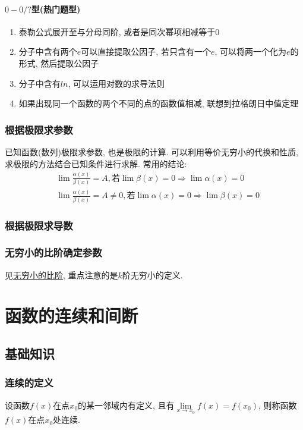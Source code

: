 \subsubsection{$ 0-0/? $型(热门题型)}
\begin{enumerate}
\item 泰勒公式展开至与分母同阶, 或者是同次幂项相减等于$ 0 $
\item 分子中含有两个$ e $可以直接提取公因子, 若只含有一个$ e $, 可以将两一个化为$ e $的形式, 然后提取公因子
\item 分子中含有$ ln $, 可以运用对数的求导法则
\item 如果出现同一个函数的两个不同的点的函数值相减, 联想到拉格朗日中值定理
\end{enumerate}
\subsection{根据极限求参数}
已知函数(数列)极限求参数, 也是极限的计算. 可以利用等价无穷小的代换和性质, 求极限的方法结合已知条件进行求解. 常用的结论:
\begin{equation*}
\begin{aligned}
& \lim\limits \frac{\alpha(x)}{\beta(x)}=A, 若 \lim\limits \beta(x)=0\Rightarrow \lim\limits \alpha(x)=0 \\
& \lim\limits \frac{\alpha(x)}{\beta(x)}=A\neq 0, 若 \lim\limits \alpha(x)=0\Rightarrow \lim\limits \beta(x)=0
\end{aligned}
\end{equation*}
\subsection{根据极限求导数}
\subsection{无穷小的比阶确定参数}
见\hyperref[无穷小的比阶]{无穷小的比阶}, 重点注意的是$ k $阶无穷小的定义.
\chapter{函数的连续和间断}
\section{基础知识}
\subsection{连续的定义}
设函数$ f(x) $在点$ x_{0} $的某一邻域内有定义, 且有$ \lim\limits_{x\rightarrow x_{0}}f(x)=f(x_{0}) $, 则称函数$ f(x) $在点$ x_{0} $处连续.
